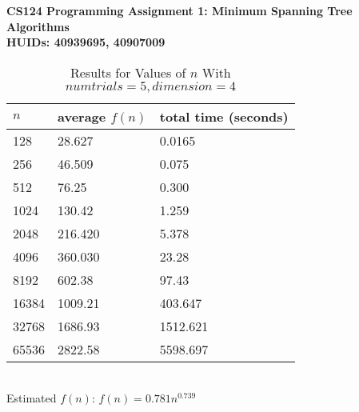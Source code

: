 \documentclass[11pt]{article}
\begin{document}
\textbf{CS124 Programming Assignment 1: Minimum Spanning Tree Algorithms\\
	HUIDs: 40939695, 40907009}
	\begin{table}[h]
		\centering
		\caption{Results for Values of $n$ With $numtrials = 5, dimension = 4$}
		\begin{tabular}{lll}
			$n$                         & average $f(n)$                        & total time (seconds)                        \\ \hline
			\multicolumn{1}{|l|}{128} & \multicolumn{1}{l|}{28.627} & \multicolumn{1}{l|}{0.0165} \\ \hline
			\multicolumn{1}{|l|}{256}    & \multicolumn{1}{l|}{46.509}       & \multicolumn{1}{l|}{0.075}       \\ \hline
			\multicolumn{1}{|l|}{512}    & \multicolumn{1}{l|}{76.25}       & \multicolumn{1}{l|}{0.300}       \\ \hline
			\multicolumn{1}{|l|}{1024}    & \multicolumn{1}{l|}{130.42}       & \multicolumn{1}{l|}{1.259}       \\ \hline
			\multicolumn{1}{|l|}{2048}    & \multicolumn{1}{l|}{216.420}       & \multicolumn{1}{l|}{5.378}       \\ \hline
			\multicolumn{1}{|l|}{4096}    & \multicolumn{1}{l|}{360.030}       & \multicolumn{1}{l|}{23.28}       \\ \hline
			\multicolumn{1}{|l|}{8192}    & \multicolumn{1}{l|}{602.38}       & \multicolumn{1}{l|}{97.43}       \\ \hline
			\multicolumn{1}{|l|}{16384}    & \multicolumn{1}{l|}{1009.21}       & \multicolumn{1}{l|}{403.647}       \\ \hline
			\multicolumn{1}{|l|}{32768}    & \multicolumn{1}{l|}{1686.93}       & \multicolumn{1}{l|}{1512.621}       \\ \hline
			\multicolumn{1}{|l|}{65536}    & \multicolumn{1}{l|}{2822.58}       & \multicolumn{1}{l|}{5598.697}       \\ \hline
		\end{tabular}
	\end{table}\\
	Estimated $f(n)$: $f(n) = 0.781n^{0.739}$
	
\end{document}

